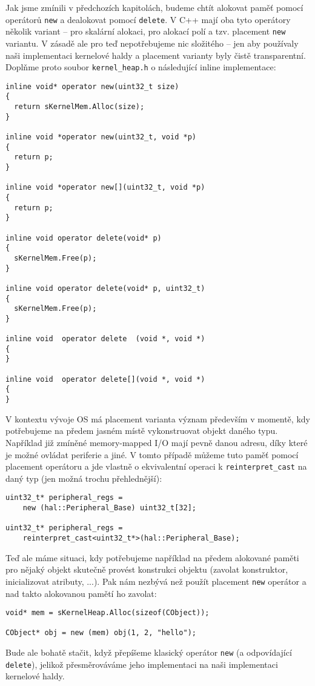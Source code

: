 \documentclass{article}
\begin{document}
Jak jsme zmínili v předchozích kapitolách, budeme chtít alokovat paměť pomocí operátorů \texttt{new} a dealokovat pomocí \texttt{delete}. V C++ mají oba tyto operátory několik variant --  pro skalární alokaci, pro alokací polí a tzv. placement \texttt{new} variantu. V zásadě ale pro teď nepotřebujeme nic složitého -- jen aby používaly naši implementaci kernelové haldy a placement varianty byly čistě transparentní. Doplňme proto soubor \texttt{kernel\_heap.h} o následující inline implementace:
\begin{lstlisting}
inline void* operator new(uint32_t size)
{
  return sKernelMem.Alloc(size);
}

inline void *operator new(uint32_t, void *p)
{
  return p;
}

inline void *operator new[](uint32_t, void *p)
{
  return p;
}

inline void operator delete(void* p)
{
  sKernelMem.Free(p);
}

inline void operator delete(void* p, uint32_t)
{
  sKernelMem.Free(p);
}

inline void  operator delete  (void *, void *)
{
}

inline void  operator delete[](void *, void *)
{
}
\end{lstlisting}

V kontextu vývoje OS má placement varianta význam především v momentě, kdy potřebujeme na předem jasném místě vykonstruovat objekt daného typu. Například již zmíněné memory-mapped I/O mají pevně danou adresu, díky které je možné ovládat periferie a jiné. V tomto případě můžeme  tuto paměť pomocí placement operátoru a jde vlastně o ekvivalentní operaci k \texttt{reinterpret\_cast} na daný typ (jen možná trochu přehlednější):
\begin{lstlisting}
uint32_t* peripheral_regs =
    new (hal::Peripheral_Base) uint32_t[32];

uint32_t* peripheral_regs =
    reinterpret_cast<uint32_t*>(hal::Peripheral_Base);
\end{lstlisting}

Teď ale máme situaci, kdy potřebujeme například na předem alokované paměti pro nějaký objekt skutečně provést konstrukci objektu (zavolat konstruktor, inicializovat atributy, ...). Pak nám nezbývá než použít placement \texttt{new} operátor a nad takto alokovanou pamětí ho zavolat:
\begin{lstlisting}
void* mem = sKernelHeap.Alloc(sizeof(CObject));

CObject* obj = new (mem) obj(1, 2, "hello");
\end{lstlisting}
Bude ale bohatě stačit, když přepíšeme klasický operátor \texttt{new} (a odpovídající \texttt{delete}), jelikož přesměrováváme jeho implementaci na naši implementaci kernelové haldy.
\end{document}
